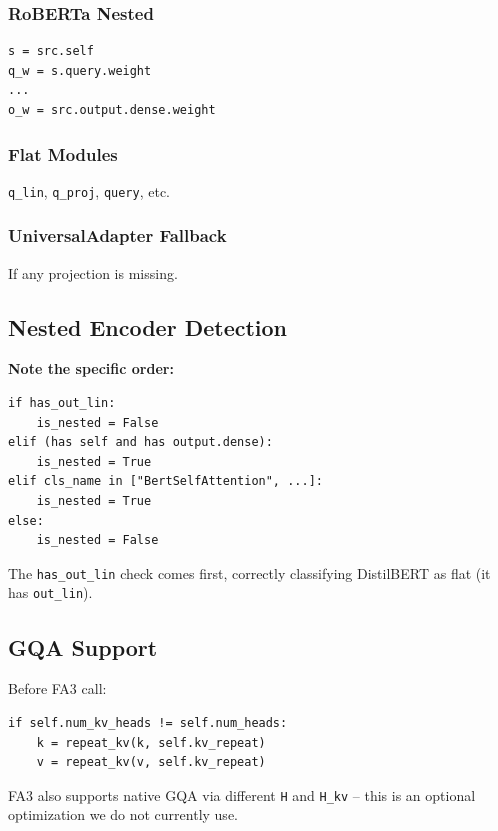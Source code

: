 \subsubsection{RoBERTa Nested}

\begin{lstlisting}
s = src.self
q_w = s.query.weight
...
o_w = src.output.dense.weight
\end{lstlisting}

\subsubsection{Flat Modules}

\texttt{q\_lin}, \texttt{q\_proj}, \texttt{query}, etc.

\subsubsection{UniversalAdapter Fallback}

If any projection is missing.

\subsection{Nested Encoder Detection}

\textbf{Note the specific order:}

\begin{lstlisting}
if has_out_lin:
    is_nested = False
elif (has self and has output.dense):
    is_nested = True
elif cls_name in ["BertSelfAttention", ...]:
    is_nested = True
else:
    is_nested = False
\end{lstlisting}

The \texttt{has\_out\_lin} check comes first, correctly classifying DistilBERT as 
flat (it has \texttt{out\_lin}).

\subsection{GQA Support}

Before FA3 call:

\begin{lstlisting}
if self.num_kv_heads != self.num_heads:
    k = repeat_kv(k, self.kv_repeat)
    v = repeat_kv(v, self.kv_repeat)
\end{lstlisting}

FA3 also supports native GQA via different \texttt{H} and \texttt{H\_kv} -- this is an 
optional optimization we do not currently use.

